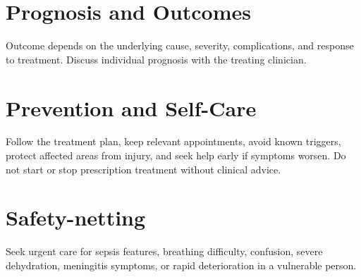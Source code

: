 \section*{Prognosis and Outcomes}
Outcome depends on the underlying cause, severity, complications, and response to treatment. Discuss individual prognosis with the treating clinician.

\section*{Prevention and Self-Care}
Follow the treatment plan, keep relevant appointments, avoid known triggers, protect affected areas from injury, and seek help early if symptoms worsen. Do not start or stop prescription treatment without clinical advice.
\section*{Safety-netting}
Seek urgent care for sepsis features, breathing difficulty, confusion, severe dehydration, meningitis symptoms, or rapid deterioration in a vulnerable person.
